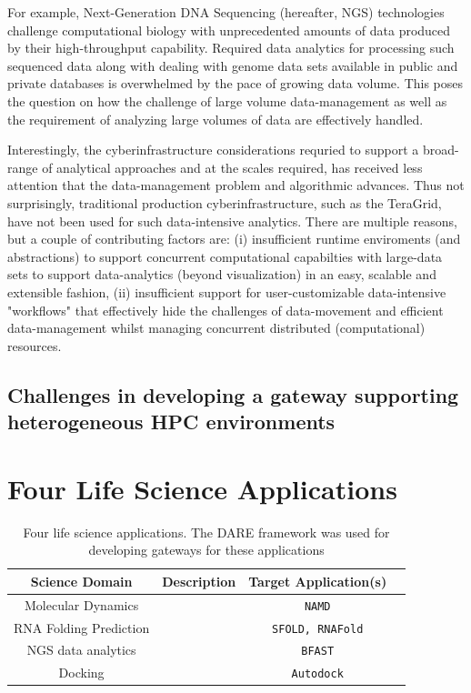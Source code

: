 \documentclass[12pt]{article}
\begin{document}
For example, Next-Generation DNA Sequencing (hereafter, NGS) technologies challenge computational biology with unprecedented
amounts of data produced by their high-throughput capability.  Required data analytics for processing such sequenced data along with dealing with genome data sets available in public and private databases is overwhelmed by the pace of growing data volume.  This poses the question on how the challenge of large volume data-management as well as the requirement of analyzing large volumes of data are effectively handled.  

Interestingly, the cyberinfrastructure considerations requried to
support a broad-range of analytical approaches and at the scales
required, has received less attention that the data-management problem
and algorithmic advances.  Thus not surprisingly, traditional
production cyberinfrastructure, such as the TeraGrid, have not been
used for such data-intensive analytics. There are multiple reasons,
but a couple of contributing factors are: (i) insufficient runtime
enviroments (and abstractions) to support concurrent computational
capabilties with large-data sets to support data-analytics (beyond
visualization) in an easy, scalable and extensible fashion, (ii)
insufficient support for user-customizable data-intensive "workflows"
that effectively hide the challenges of data-movement and efficient
data-management whilst managing concurrent distributed (computational)
resources.



\subsection{Challenges in developing a gateway supporting heterogeneous HPC environments}



\section{Four Life Science Applications}

\begin{table}
\small
\begin{tabular}{|c|c|c|c|} 
  \hline Science Domain & Description & Target Application(s) 
  \\ \hline \hline 
  
  Molecular Dynamics &  &  \texttt{NAMD}  \\ \hline
  RNA Folding Prediction &  & \texttt{SFOLD, RNAFold} \\ \hline
  NGS data analytics &    &  \texttt{BFAST} \\ \hline
  Docking  &   & \texttt{Autodock} \\ \hline

\hline
\end{tabular} \caption{Four life science applications. The DARE framework was used for developing gateways for these applications}
 \label{table:four-applications} 
\end{table}
\end{document}
